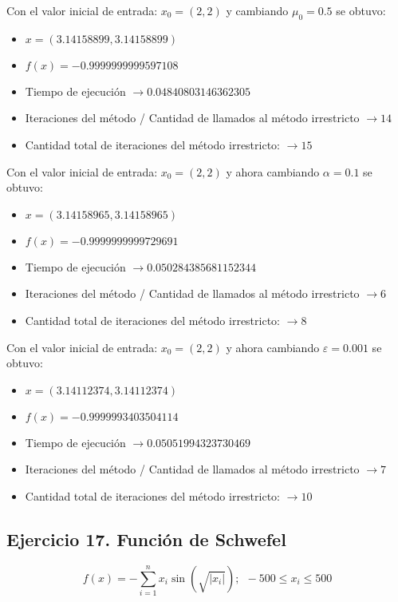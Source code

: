 \documentclass[titlepage, 11pt]{scrartcl}
\begin{document}
	Con el valor inicial de entrada: $x_0 = (2, 2)$ y cambiando $\mu_0 = 0.5$ se obtuvo:
	\begin{itemize}
		\item $x = (3.14158899, 3.14158899)$
		\item $f(x) = -0.9999999999597108$
		\item Tiempo de ejecución $\rightarrow 0.04840803146362305$
		\item Iteraciones del método / Cantidad de llamados al método irrestricto $\rightarrow 14$
		\item Cantidad total de iteraciones del método irrestricto: $\rightarrow 15$
	\end{itemize}
	Con el valor inicial de entrada: $x_0 = (2, 2)$ y ahora cambiando $\alpha = 0.1$ se obtuvo:
	\begin{itemize}
		\item $x = (3.14158965, 3.14158965)$
		\item $f(x) = -0.9999999999729691$
		\item Tiempo de ejecución $\rightarrow 0.050284385681152344$
		\item Iteraciones del método / Cantidad de llamados al método irrestricto $\rightarrow 6$
		\item Cantidad total de iteraciones del método irrestricto: $\rightarrow 8$
	\end{itemize}
	Con el valor inicial de entrada: $x_0 = (2, 2)$ y ahora cambiando $\varepsilon = 0.001$ se obtuvo:
	\begin{itemize}
		\item $x = (3.14112374, 3.14112374)$
		\item $f(x) = -0.9999993403504114$
		\item Tiempo de ejecución $\rightarrow 0.05051994323730469$
		\item Iteraciones del método / Cantidad de llamados al método irrestricto $\rightarrow 7$
		\item Cantidad total de iteraciones del método irrestricto: $\rightarrow 10$
	\end{itemize}
	
	\subsection{Ejercicio 17. Función de Schwefel}
	\begin{equation*}
		f(x) = -\sum_{i = 1}^{n}x_i \sin(\sqrt{|x_i|}); \ \ -500 \leq x_i \leq 500
	\end{equation*}
\end{document}

